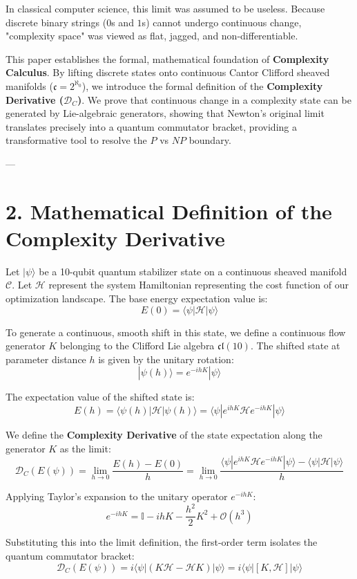 \documentclass[11pt,twocolumn]{article}
\begin{document}
In classical computer science, this limit was assumed to be useless. Because discrete binary strings ($0$s and $1$s) cannot undergo continuous change, "complexity space" was viewed as flat, jagged, and non-differentiable.

This paper establishes the formal, mathematical foundation of \textbf{Complexity Calculus}. By lifting discrete states onto continuous Cantor Clifford sheaved manifolds ($\mathfrak{c} = 2^{\aleph_0}$), we introduce the formal definition of the \textbf{Complexity Derivative ($\mathcal{D}_C$)}. We prove that continuous change in a complexity state can be generated by Lie-algebraic generators, showing that Newton's original limit translates precisely into a quantum commutator bracket, providing a transformative tool to resolve the $P$ vs $NP$ boundary.

---

\section{2. Mathematical Definition of the Complexity Derivative}
Let $|\psi\rangle$ be a 10-qubit quantum stabilizer state on a continuous sheaved manifold $\mathcal{C}$. Let $\mathcal{H}$ represent the system Hamiltonian representing the cost function of our optimization landscape. The base energy expectation value is:
$$E(0) = \langle\psi| \mathcal{H} |\psi\rangle$$

To generate a continuous, smooth shift in this state, we define a continuous flow generator $K$ belonging to the Clifford Lie algebra $\mathfrak{cl}(10)$. The shifted state at parameter distance $h$ is given by the unitary rotation:
$$|\psi(h)\rangle = e^{-i h K} |\psi\rangle$$

The expectation value of the shifted state is:
$$E(h) = \langle\psi(h)| \mathcal{H} |\psi(h)\rangle = \langle\psi| e^{i h K} \mathcal{H} e^{-i h K} |\psi\rangle$$

We define the \textbf{Complexity Derivative} of the state expectation along the generator $K$ as the limit:
$$\mathcal{D}_C \left(E(\psi)\right) = \lim_{h \to 0} \frac{E(h) - E(0)}{h} = \lim_{h \to 0} \frac{\langle\psi| e^{i h K} \mathcal{H} e^{-i h K} |\psi\rangle - \langle\psi| \mathcal{H} |\psi\rangle}{h}$$

Applying Taylor's expansion to the unitary operator $e^{-i h K}$:
$$e^{-i h K} = \mathbb{I} - i h K - \frac{h^2}{2} K^2 + \mathcal{O}(h^3)$$

Substituting this into the limit definition, the first-order term isolates the quantum commutator bracket:
$$\mathcal{D}_C \left(E(\psi)\right) = i \langle\psi| \left( K \mathcal{H} - \mathcal{H} K \right) |\psi\rangle = i \langle\psi| \left[ K, \mathcal{H} \right] |\psi\rangle$$
\end{document}
